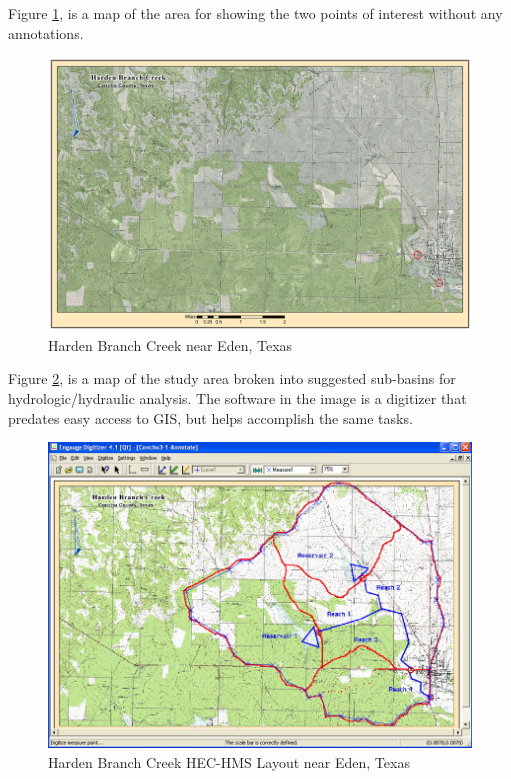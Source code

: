 \documentclass[12pt]{article}
\begin{document}
\clearpage

Figure \ref{fig:background}, is a map  of the area for showing the two points of interest without any annotations.

\begin{figure}[h!] %
   \centering
   \includegraphics[width=6.5in]{Concho-Background-POI.png} 
   \caption{Harden Branch Creek near Eden, Texas}
   \label{fig:background}
\end{figure}

\clearpage

Figure \ref{fig:hmslayout}, is a map of the study area broken into suggested sub-basins for hydrologic/hydraulic analysis.  The software in the image is a digitizer that predates easy access to GIS, but helps accomplish the same tasks.

\begin{figure}[h!] %
   \centering
   \includegraphics[width=6in]{layout.png} 
   \caption{Harden Branch Creek HEC-HMS Layout near Eden, Texas}
   \label{fig:hmslayout}
\end{figure}
\end{document}
